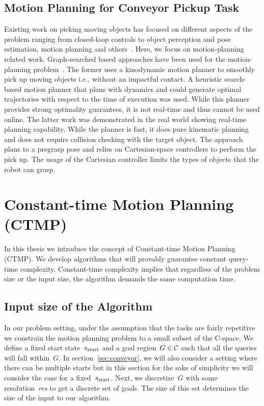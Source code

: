 \documentclass[a4paper,10pt]{article}
\begin{document}
\subsection{Motion Planning for Conveyor Pickup Task}
Existing work on picking moving objects has focused on different aspects of the problem ranging from closed-loop controls to object perception and pose estimation, motion planning and others~\cite{allen1993automated, han2019toward, stogl2017tracking, zhang2018gilbreth}. 
%
Here, we focus on motion-planning related work. Graph-searched based approaches have been used for the motion-planning problem~\cite{cowley2013perception, menon2014motion}. The former uses a kinodynamic motion planner to smoothly pick up moving objects i.e., without an impactful contact. A heuristic search-based motion planner that plans with dynamics and could generate optimal trajectories with respect to the time of execution was used. While this planner provides strong optimality guarantees, it is not real-time and thus cannot be used online.
%
The latter work was demonstrated in the real world showing real-time planning capability. While the planner is fast, it does  pure kinematic planning and does not require collision checking with the target object. The approach plans to a pregrasp pose and relies on Cartesian-space controllers to perform the pick up. The usage of the Cartesian controller limits the types of objects that the robot can grasp.

\section{Constant-time Motion Planning (CTMP)}
In this thesis we introduce the concept of Constant-time Motion Planning (CTMP). We develop algorithms that will provably guarantee constant query-time complexity. Constant-time complexity implies that regardless of the problem size or the input size, the algorithm demands the same computation time.

\subsection{Input size of the Algorithm}
In our problem setting, under the assumption that the tasks are fairly repetitive we constrain the motion planning problem to a small subset of the C-space. We define a fixed start state~$s_{\textrm{start}}$ and a goal region~$G \in \mathcal{C}$ such that all the queries will fall within~$G$. In section~\ref{sec:conveyor}, we will also consider a setting where there can be multiple starts but in this section for the sake of simplicity we will consider the case for a fixed~$s_{\textrm{start}}$. Next, we discretize~$G$ with some resolution~\textit{res} to get a discrete set of goals. The size of this set determines the size of the input to our algorithm.
\end{document}
